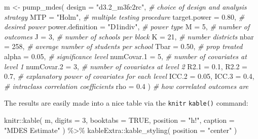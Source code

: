 \documentclass{article}
\newenvironment{Shaded}{\begin{snugshade}}{\end{snugshade}}
\newcommand{\AttributeTok}[1]{\textcolor[rgb]{0.77,0.63,0.00}{#1}}
\newcommand{\CommentTok}[1]{\textcolor[rgb]{0.56,0.35,0.01}{\textit{#1}}}
\newcommand{\ConstantTok}[1]{\textcolor[rgb]{0.00,0.00,0.00}{#1}}
\newcommand{\DecValTok}[1]{\textcolor[rgb]{0.00,0.00,0.81}{#1}}
\newcommand{\FloatTok}[1]{\textcolor[rgb]{0.00,0.00,0.81}{#1}}
\newcommand{\FunctionTok}[1]{\textcolor[rgb]{0.00,0.00,0.00}{#1}}
\newcommand{\NormalTok}[1]{#1}
\newcommand{\OtherTok}[1]{\textcolor[rgb]{0.56,0.35,0.01}{#1}}
\newcommand{\SpecialCharTok}[1]{\textcolor[rgb]{0.00,0.00,0.00}{#1}}
\newcommand{\StringTok}[1]{\textcolor[rgb]{0.31,0.60,0.02}{#1}}
\begin{document}
\begin{Shaded}
\begin{Highlighting}[]
\NormalTok{m }\OtherTok{\textless{}{-}} \FunctionTok{pump\_mdes}\NormalTok{(}
  \AttributeTok{design =} \StringTok{"d3.2\_m3fc2rc"}\NormalTok{,      }\CommentTok{\# choice of design and analysis strategy}
  \AttributeTok{MTP =} \StringTok{"Holm"}\NormalTok{,                 }\CommentTok{\# multiple testing procedure}
  \AttributeTok{target.power =} \FloatTok{0.80}\NormalTok{,          }\CommentTok{\# desired power}
  \AttributeTok{power.definition =} \StringTok{"D1indiv"}\NormalTok{, }\CommentTok{\# power type}
  \AttributeTok{M =} \DecValTok{5}\NormalTok{,                        }\CommentTok{\# number of outcomes}
  \AttributeTok{J =} \DecValTok{3}\NormalTok{,                        }\CommentTok{\# number of schools per block}
  \AttributeTok{K =} \DecValTok{21}\NormalTok{,                       }\CommentTok{\# number districts}
  \AttributeTok{nbar =} \DecValTok{258}\NormalTok{,                   }\CommentTok{\# average number of students per school}
  \AttributeTok{Tbar =} \FloatTok{0.50}\NormalTok{,                  }\CommentTok{\# prop treated}
  \AttributeTok{alpha =} \FloatTok{0.05}\NormalTok{,                 }\CommentTok{\# significance level}
  \AttributeTok{numCovar.1 =} \DecValTok{5}\NormalTok{,               }\CommentTok{\# number of covariates at level 1}
  \AttributeTok{numCovar.2 =} \DecValTok{3}\NormalTok{,               }\CommentTok{\# number of covariates at level 2}
  \AttributeTok{R2.1 =} \FloatTok{0.1}\NormalTok{, }\AttributeTok{R2.2 =} \FloatTok{0.7}\NormalTok{,       }\CommentTok{\# explanatory power of covariates for each level}
  \AttributeTok{ICC.2 =} \FloatTok{0.05}\NormalTok{, }\AttributeTok{ICC.3 =} \FloatTok{0.4}\NormalTok{,    }\CommentTok{\# intraclass correlation coefficients}
  \AttributeTok{rho =} \FloatTok{0.4}\NormalTok{ )                   }\CommentTok{\# how correlated outcomes are}
\end{Highlighting}
\end{Shaded}

The results are easily made into a nice table via the \texttt{knitr}
\texttt{kable()} command:

\begin{Shaded}
\begin{Highlighting}[]
\NormalTok{knitr}\SpecialCharTok{::}\FunctionTok{kable}\NormalTok{( m, }\AttributeTok{digits =} \DecValTok{3}\NormalTok{, }\AttributeTok{booktabs =} \ConstantTok{TRUE}\NormalTok{,}
              \AttributeTok{position =} \StringTok{"h!"}\NormalTok{, }\AttributeTok{caption =} \StringTok{"MDES Estimate"}\NormalTok{ ) }\SpecialCharTok{\%\textgreater{}\%}
\NormalTok{  kableExtra}\SpecialCharTok{::}\FunctionTok{kable\_styling}\NormalTok{( }\AttributeTok{position =} \StringTok{"center"}\NormalTok{ )}
\end{Highlighting}
\end{Shaded}
\end{document}
